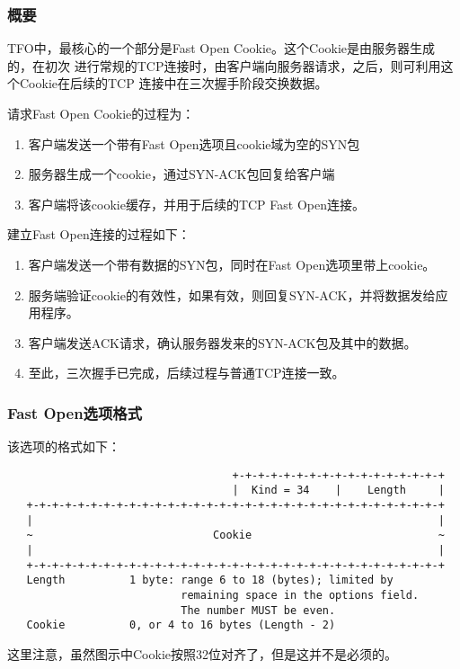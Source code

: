 \subsubsection{概要}
\label{subsubsec:rfc7413-overview}
TFO中，最核心的一个部分是Fast Open Cookie。这个Cookie是由服务器生成的，在初次
进行常规的TCP连接时，由客户端向服务器请求，之后，则可利用这个Cookie在后续的TCP
连接中在三次握手阶段交换数据。

请求Fast Open Cookie的过程为：
\begin{enumerate}
  \item 客户端发送一个带有Fast Open选项且cookie域为空的SYN包
  \item 服务器生成一个cookie，通过SYN-ACK包回复给客户端
  \item 客户端将该cookie缓存，并用于后续的TCP Fast Open连接。
\end{enumerate}

建立Fast Open连接的过程如下：
\begin{enumerate}
  \item 客户端发送一个带有数据的SYN包，同时在Fast Open选项里带上cookie。
  \item 服务端验证cookie的有效性，如果有效，则回复SYN-ACK，并将数据发给应用程序。
  \item 客户端发送ACK请求，确认服务器发来的SYN-ACK包及其中的数据。
  \item 至此，三次握手已完成，后续过程与普通TCP连接一致。
\end{enumerate}

\subsubsection{Fast Open选项格式}
\label{subsubsec:fast-open-option}
该选项的格式如下：
\begin{verbatim}
                                   +-+-+-+-+-+-+-+-+-+-+-+-+-+-+-+-+
                                   |  Kind = 34    |    Length     |
   +-+-+-+-+-+-+-+-+-+-+-+-+-+-+-+-+-+-+-+-+-+-+-+-+-+-+-+-+-+-+-+-+
   |                                                               |
   ~                            Cookie                             ~
   |                                                               |
   +-+-+-+-+-+-+-+-+-+-+-+-+-+-+-+-+-+-+-+-+-+-+-+-+-+-+-+-+-+-+-+-+
   Length          1 byte: range 6 to 18 (bytes); limited by
                           remaining space in the options field.
                           The number MUST be even.
   Cookie          0, or 4 to 16 bytes (Length - 2)
\end{verbatim}
这里注意，虽然图示中Cookie按照32位对齐了，但是这并不是必须的。
